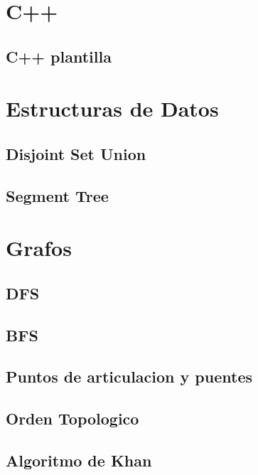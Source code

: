 \section{C++}
\subsection{C++ plantilla}
\raggedbottom
\hrulefill

\section{Estructuras de Datos}
\subsection{Disjoint Set Union}
\raggedbottom
\hrulefill
\subsection{Segment Tree}
\raggedbottom
\hrulefill

\section{Grafos}
\subsection{DFS}
\raggedbottom
\hrulefill
\subsection{BFS}
\raggedbottom
\hrulefill
\subsection{Puntos de articulacion y puentes}
\raggedbottom
\hrulefill
\subsection{Orden Topologico}
\raggedbottom
\hrulefill
\subsection{Algoritmo de Khan}
\raggedbottom
\hrulefill
